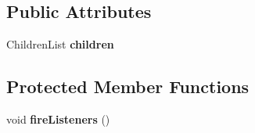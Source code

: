 \subsection*{Public Attributes}
\begin{DoxyCompactItemize}
\item 
\hypertarget{class_c_gui_panel_a385aeb99791ec7a57401626c03c91a83}{
ChildrenList {\bfseries children}}
\label{class_c_gui_panel_a385aeb99791ec7a57401626c03c91a83}

\end{DoxyCompactItemize}
\subsection*{Protected Member Functions}
\begin{DoxyCompactItemize}
\item 
\hypertarget{class_c_gui_panel_a43c4f54fc39014c4949a4d93fc9b006c}{
void {\bfseries fireListeners} ()}
\label{class_c_gui_panel_a43c4f54fc39014c4949a4d93fc9b006c}

\end{DoxyCompactItemize}

